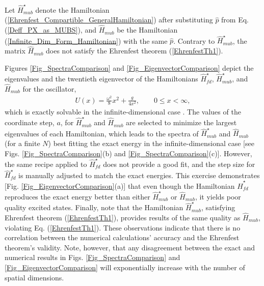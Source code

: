 \documentclass[twocolumn,pra,aps,showpacs,preprintnumbers,nofootinbib, superscriptaddress, amsmath,amssymb]{revtex4}
\begin{document}
Let $\hat{H}_{mub}^{\star}$ denote the Hamiltonian (\ref{Ehrenfest_Compartible_GeneralHamiltonian}) after substituting $\hat{p}$ from Eq. (\ref{Deff_PX_as_MUBS}), and $\hat{H}_{mub}$ be the Hamiltonian (\ref{Infinite_Dim_Form_Hamiltonian}) with the same $\hat{p}$. Contrary to $\hat{H}_{mub}^{\star}$, the matrix $\hat{H}_{mub}$ does not satisfy the Ehrenfest theorem (\ref{EhrenfestTh1}).

Figures \ref{Fig_SpectraComparison} and \ref{Fig_EigenvectorComparison} depict the eigenvalues and the twentieth eigenvector of the Hamiltonians $\hat{H}^{\star}_{fd}$, $\hat{H}_{mub}^{\star}$, and  $\hat{H}_{mub}$ for the oscillator, 
\begin{align}\label{SingularHarmonicOscil_Hamiltonian}
	U(x) = \frac{\omega^2}{8} x^2  + \frac{g}{4x^2}, \qquad 0 \leqslant x < \infty, 
\end{align}
which is exactly solvable in the infinite-dimensional case \cite{Calogero1969}. The values of the coordinate step, $a$, for $\hat{H}_{mub}^{\star}$ and $\hat{H}_{mub}$ are selected to minimize the largest eigenvalues of each Hamiltonian, which leads to the spectra of  $\hat{H}_{mub}^{\star}$ and $\hat{H}_{mub}$ (for a finite $N$) best fitting the exact energy in the infinite-dimensional case [see Figs. \ref{Fig_SpectraComparison}(b) and \ref{Fig_SpectraComparison}(c)]. However, the same recipe applied to $\hat{H}_{fd}^{\star}$ does not provide a good fit, and the step size for $\hat{H}_{fd}^{\star}$ is manually adjusted to match the exact energies. This exercise  demonstrates [Fig. \ref{Fig_EigenvectorComparison}(a)] that even though the Hamiltonian $\hat{H}_{fd}^{\star}$ reproduces the exact energy better than either $\hat{H}_{mub}^{\star}$ or $\hat{H}_{mub}$, it yields poor quality excited states. Finally, note that the Hamiltonian $\hat{H}_{mub}^{\star}$, satisfying Ehrenfest theorem (\ref{EhrenfestTh1}), provides results of the same quality as $\hat{H}_{mub}$, violating Eq.  (\ref{EhrenfestTh1}). These observations indicate that there is no correlation between the  numerical calculations' accuracy and the Ehrenfest theorem's validity. Note, however, that any disagreement between the exact and numerical results in Figs. \ref{Fig_SpectraComparison} and \ref{Fig_EigenvectorComparison} will exponentially increase with the number of spatial dimensions.
\end{document}
